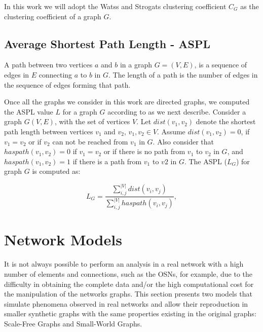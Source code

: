In this work we will adopt the Watss and Strogats clustering coefficient $C_G$ as the clustering coefficient of a graph $G$. 

\subsection*{Average Shortest Path Length - ASPL}
A path between two vertices $a$ and $b$ in a graph $G=(V,E)$, is  a sequence of edges in $E$ connecting $a$ to $b$ in $G$. The length of a path  is  the number of edges in the sequence of edges forming that path. 

Once all the graphs we consider in this work are directed graphs, we computed the  ASPL value $L$ for a graph $G$ according to  \cite{Mao2013} as we next describe. Consider a graph $G(V,E)$,  with the set of vertices $V$. Let $dist(v_1,v_2)$ denote the shortest path length between vertices $v_1$ and $v_2$,  $v_1,v_2 \in V$. Assume $dist(v_1,v_2)=0$, if $v_1 =v_2$ or if $v_2$ can not be reached from $v_1$ in $G$. Also consider that $haspath(v_1,v_2)=0$ if $v_1 = v_2$ or  if there is no path from $v_1$ to $v_2$ in $G$, and $haspath(v_1,v_2)=1$ if there is a path from $v_1$ to $v2$ in $G$. The  ASPL ($L_G$) for graph $G$ is computed as:

\begin{equation}
\label{eq:ASPL}
   L_{G} = \frac{\sum\limits_{i,j}^{|V|} dist(v_i,v_j)}{\sum\limits_{i,j}^{|V|} haspath(v_i,v_j)},
\end{equation}



\section{Network Models}
\label{sec:net_models}
It is not always possible to perform an analysis in a real network with a high number of elements and connections, such as the OSNs, for example, due to the difficulty in obtaining the complete data and/or the high computational cost for the manipulation of the networks graphs. This section presents two models that simulate phenomena observed in real networks and allow their reproduction in smaller synthetic graphs with the same properties existing in the original graphs: Scale-Free Graphs and Small-World Graphs.


